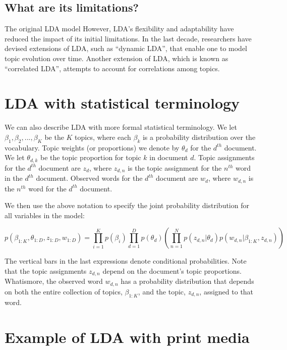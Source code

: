 \documentclass[12pt,]{article}
\begin{document}
\subsection{What are its limitations?}\label{what-are-its-limitations}

The original LDA model However, LDA's flexibility and adaptability have
reduced the impact of its initial limitations. In the last decade,
researchers have devised extensions of LDA, such as ``dynamic LDA'',
that enable one to model topic evolution over time. Another extension of
LDA, which is known as ``correlated LDA'', attempts to account for
correlations among topics.

\section{LDA with statistical
terminology}\label{lda-with-statistical-terminology}

We can also describe LDA with more formal statistical terminology. We
let \(\beta_1, \beta_2, ..., \beta_K\) be the \(K\) topics, where each
\(\beta_k\) is a probability distribution over the vocabulary. Topic
weights (or proportions) we denote by \(\theta_d\) for the \(d^{th}\)
document. We let \(\theta_{d,k}\) be the topic proportion for topic
\(k\) in document \(d\). Topic assignments for the \(d^{th}\) document
are \(z_d\), where \(z_{d,n}\) is the topic assignment for the
\(n^{th}\) word in the \(d^{th}\) document. Observed words for the
\(d^{th}\) document are \(w_d\), where \(w_{d, n}\) is the \(n^{th}\)
word for the \(d^{th}\) document.

We then use the above notation to specify the joint probability
distribution for all variables in the model:

\[p(\beta_{1:K}, \theta_{1:D}, z_{1:D}, w_{1:D}) = \prod_{i = 1}^Kp(\beta_i)\prod_{d = 1}^Dp(\theta_d)\left( \prod_{n = 1}^N p(z_{d,n}|\theta_d)p(w_{d,n}|\beta_{1:K}, z_{d,n})\right)\]

The vertical bars in the last expressions denote conditional
probabilities. Note that the topic assignments \(z_{d,n}\) depend on the
document's topic proportions. Whatismore, the observed word \(w_{d,n}\)
has a probability distribution that depends on both the entire
collection of topics, \(\beta_{1:K}\), and the topic, \(z_{d,n}\),
assigned to that word.

\section{Example of LDA with print
media}\label{example-of-lda-with-print-media}
\end{document}
